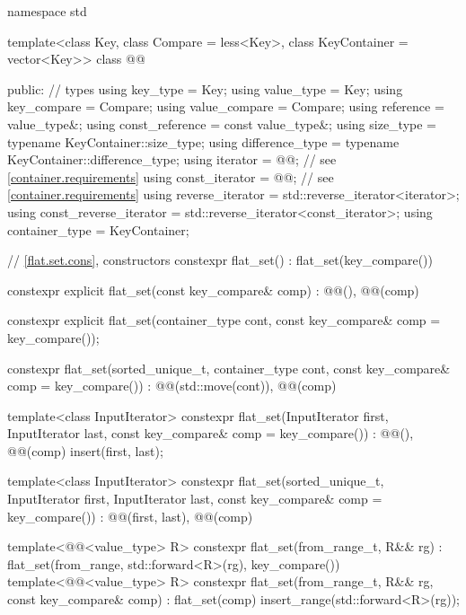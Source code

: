 \begin{codeblock}
namespace std {
  template<class Key, class Compare = less<Key>, class KeyContainer = vector<Key>>
  class @@ {
  public:
    // types
    using key_type                  = Key;
    using value_type                = Key;
    using key_compare               = Compare;
    using value_compare             = Compare;
    using reference                 = value_type&;
    using const_reference           = const value_type&;
    using size_type                 = typename KeyContainer::size_type;
    using difference_type           = typename KeyContainer::difference_type;
    using iterator                  = @@;  // see \ref{container.requirements}
    using const_iterator            = @@;  // see \ref{container.requirements}
    using reverse_iterator          = std::reverse_iterator<iterator>;
    using const_reverse_iterator    = std::reverse_iterator<const_iterator>;
    using container_type            = KeyContainer;

    // \ref{flat.set.cons}, constructors
    constexpr flat_set() : flat_set(key_compare()) { }

    constexpr explicit flat_set(const key_compare& comp)
      : @@(), @@(comp) { }

    constexpr explicit flat_set(container_type cont, const key_compare& comp = key_compare());

    constexpr flat_set(sorted_unique_t, container_type cont,
                       const key_compare& comp = key_compare())
      : @@(std::move(cont)), @@(comp) { }

    template<class InputIterator>
      constexpr flat_set(InputIterator first, InputIterator last,
                         const key_compare& comp = key_compare())
        : @@(), @@(comp)
        { insert(first, last); }

    template<class InputIterator>
      constexpr flat_set(sorted_unique_t, InputIterator first, InputIterator last,
               const key_compare& comp = key_compare())
        : @@(first, last), @@(comp) { }

    template<@@<value_type> R>
      constexpr flat_set(from_range_t, R&& rg)
        : flat_set(from_range, std::forward<R>(rg), key_compare()) { }
    template<@@<value_type> R>
      constexpr flat_set(from_range_t, R&& rg, const key_compare& comp)
        : flat_set(comp)
        { insert_range(std::forward<R>(rg)); }

}}
\end{codeblock}
